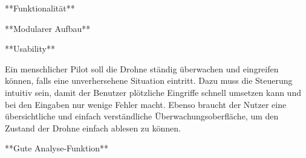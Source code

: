**Funktionalität**

**Modularer Aufbau**

**Usability**

Ein menschlicher Pilot soll die Drohne ständig überwachen und eingreifen können, falls eine unverhersehene Situation eintritt. Dazu muss die Steuerung intuitiv sein, damit der Benutzer plötzliche Eingriffe schnell umsetzen kann und bei den Eingaben nur wenige Fehler macht. Ebenso braucht der Nutzer eine übersichtliche und einfach verständliche Überwachungsoberfläche, um den Zustand der Drohne einfach ablesen zu können.

**Gute Analyse-Funktion**





